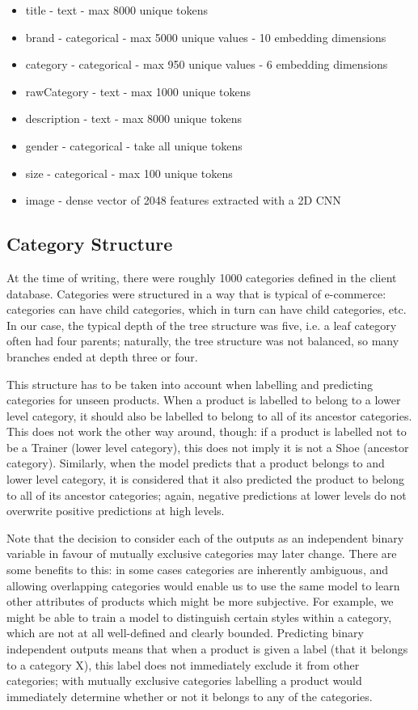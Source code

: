 \begin{itemize}[noitemsep]
  \item title - text - max 8000 unique tokens
  \item brand - categorical - max 5000 unique values - 10 embedding dimensions
  \item category - categorical - max 950 unique values - 6 embedding dimensions
  \item rawCategory - text - max 1000 unique tokens
  \item description - text - max 8000 unique tokens
  \item gender - categorical - take all unique tokens
  \item size - categorical - max 100 unique tokens
  \item image - dense vector of 2048 features extracted with a 2D CNN
\end{itemize}

\subsection{Category Structure}
\label{cat_tree}

At the time of writing, there were roughly 1000 categories defined in the client database.
Categories were structured in a way that is typical of  e-commerce:  categories can have  child categories, which in turn can have child categories, etc.
In our case, the typical depth of the tree structure was five, i.e. a leaf category often had four parents;  naturally, the tree structure was not balanced, so many branches ended at depth three or four.

This structure has to be taken into account when labelling and  predicting categories for unseen products.
When a product is labelled to belong to a  lower level category,  it should also be labelled to belong to all of its ancestor categories. This does not work the other way around, though:  if a product is labelled not to be a Trainer (lower level category),  this does not imply it is not a Shoe (ancestor category).
Similarly, when the model predicts that a product belongs to and  lower level category, it is considered that it also predicted the product to belong to all of its  ancestor categories;  again, negative predictions at lower levels do not  overwrite positive predictions at high levels.

Note that the decision to consider each of the outputs as an independent binary variable in favour of mutually exclusive categories may later change.
There are some benefits to this: in some cases categories are inherently ambiguous, and allowing overlapping categories would enable us to use the same model to learn other attributes of products which might be more subjective.
For example, we might be able to train a model to distinguish certain styles within a category, which are not at all well-defined and clearly bounded.
Predicting binary independent outputs means that when a product is given a label (that it belongs to a category X),  this label does not immediately  exclude it from other categories;  with mutually exclusive categories labelling a product  would immediately determine whether or not it belongs to any of the categories.

